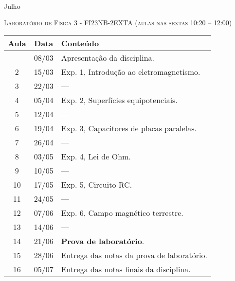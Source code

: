 %
\begin{marginfigure}
    \centering
    Julho\\
\end{marginfigure}
\vspace{1cm}
\begin{center}
\Large\textsc{Laboratório de Física 3 - FI23NB-2EXTA (aulas nas sextas 10:20 -- 12:00)}
\end{center}

\begin{center}
\begin{longtable}{ccp{70mm}}
\toprule
Aula & Data & Conteúdo \\
\midrule
\endhead
\bottomrule
\endfoot
1 & 08/03 & Apresentação da disciplina. \\
2 & 15/03 & Exp. 1, Introdução ao eletromagnetismo. \\
3 & 22/03 & --- \\
4 & 05/04 & Exp. 2, Superfícies equipotenciais. \\
5 & 12/04 & --- \\
6 & 19/04 & Exp. 3, Capacitores de placas paralelas. \\
7 & 26/04 & --- \\
8 & 03/05 & Exp. 4, Lei de Ohm. \\
9 & 10/05 & --- \\
10 & 17/05 & Exp. 5, Circuito RC. \\
11 & 24/05 & --- \\
12 & 07/06 & Exp. 6, Campo magnético terrestre. \\
13 & 14/06 & --- \\
14 & 21/06 & \textbf{Prova de laboratório}. \\
15 & 28/06 & Entrega das notas da prova de laboratório. \\ 
16 & 05/07 & Entrega das notas finais da disciplina. \\
\end{longtable}
\end{center}

\cleardoublepage
